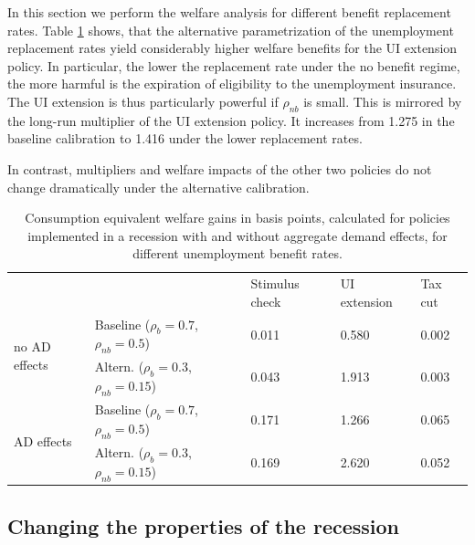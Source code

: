 \documentclass[../HAFiscal]{subfiles}
\begin{document}
In this section we perform the welfare analysis for different benefit replacement rates. Table \ref{tab:robustness_benefit_results} shows, that the alternative parametrization of the unemployment replacement rates yield considerably higher welfare benefits for the UI extension policy. In particular, the lower the replacement rate under the no benefit regime, the more harmful is the expiration of eligibility to the unemployment insurance. The UI extension is thus particularly powerful if $\rho_{nb}$ is small. This is mirrored by the long-run multiplier of the UI extension policy. It increases from 1.275 in the baseline calibration to 1.416 under the lower replacement rates.

In contrast, multipliers and welfare impacts of the other two policies do not change dramatically under the alternative calibration. 


\begin{table}[]
	\begin{center}
		\begin{tabular}{@{}lllll@{}}
			\toprule
			&                    & Stimulus check & UI extension & Tax cut \\ \cmidrule(l){1-5} 
			\multirow{2}{*}{no AD effects} 	& Baseline  ($\rho_{b}=0.7$, $\rho_{nb}=0.5$) 		& 0.011          & 0.580        & 0.002   \\
											& Altern.  ($\rho_{b}=0.3$, $\rho_{nb}=0.15$) 	& 0.043          & 1.913        & 0.003   \\ \cmidrule(l){1-5} 
			\multirow{2}{*}{AD effects}		& Baseline  ($\rho_{b}=0.7$, $\rho_{nb}=0.5$)    	& 0.171          & 1.266        & 0.065   \\
											& Altern.  ($\rho_{b}=0.3$, $\rho_{nb}=0.15$)    & 0.169          & 2.620        & 0.052   \\ \cmidrule(l){1-5} 
		\end{tabular}
		\caption{Consumption equivalent welfare gains in basis points, calculated for policies implemented in a recession with and without aggregate demand effects, for different unemployment benefit rates.}
		\label{tab:robustness_benefit_results}
	\end{center}
\end{table}




\FloatBarrier
\subsection{Changing the properties of the recession}
\end{document}
